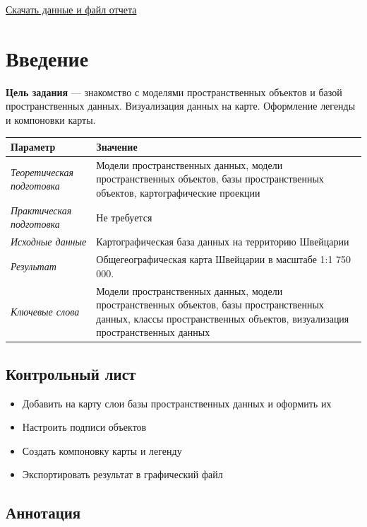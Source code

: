 \documentclass[12pt,]{book}
\providecommand{\tightlist}{%
  \setlength{\itemsep}{0pt}\setlength{\parskip}{0pt}}
\begin{document}
\href{http://autolab.geogr.msu.ru/gis/data/Ex02.zip}{Скачать данные и файл отчета}

\hypertarget{map-design-general-intro}{%
\section{Введение}\label{map-design-general-intro}}

\textbf{Цель задания} --- знакомство с моделями пространственных объектов и базой пространственных данных. Визуализация данных на карте. Оформление легенды и компоновки карты.

\begin{longtable}[]{@{}ll@{}}
\toprule
Параметр & Значение\tabularnewline
\midrule
\endhead
\emph{Теоретическая подготовка} & Модели пространственных данных, модели пространственных объектов, базы пространственных объектов, картографические проекции\tabularnewline
\emph{Практическая подготовка} & Не требуется\tabularnewline
\emph{Исходные данные} & Картографическая база данных на территорию Швейцарии\tabularnewline
\emph{Результат} & Общегеографическая карта Швейцарии в масштабе 1:1 750 000.\tabularnewline
\emph{Ключевые слова} & Модели пространственных данных, модели пространственных объектов, базы пространственных данных, классы пространственных объектов, визуализация пространственных данных\tabularnewline
\bottomrule
\end{longtable}

\hypertarget{map-design-general-control}{%
\subsection{Контрольный лист}\label{map-design-general-control}}

\begin{itemize}
\tightlist
\item
  Добавить на карту слои базы пространственных данных и оформить их
\item
  Настроить подписи объектов
\item
  Создать компоновку карты и легенду
\item
  Экспортировать результат в графический файл
\end{itemize}

\hypertarget{map-design-general-annotation}{%
\subsection{Аннотация}\label{map-design-general-annotation}}
\end{document}
